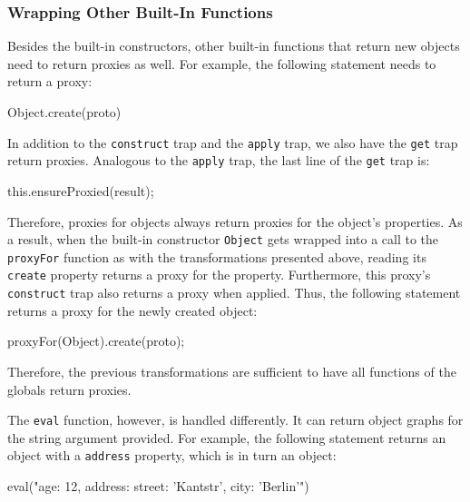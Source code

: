 \subsubsection{Wrapping Other Built-In Functions}

Besides the built-in constructors, other built-in functions that return new objects need to return proxies as well.
For example, the following statement needs to return a proxy:

\begin{code}{}{}
Object.create(proto)
\end{code}
\iffalse
\end{verbatim}\fi

In addition to the \lstinline{construct} trap and the \lstinline{apply} trap, we also have the \lstinline{get} trap return proxies.
Analogous to the \lstinline{apply} trap, the last line of the \lstinline{get} trap is:

\begin{code}{}{}
this.ensureProxied(result);
\end{code}
\iffalse
\end{verbatim}\fi


Therefore, proxies for objects always return proxies for the object's properties.
As a result, when the built-in constructor \lstinline{Object} gets wrapped into a call to the \lstinline{proxyFor} function as with the transformations presented above, reading its \lstinline{create} property returns a proxy for the property.
Furthermore, this proxy's \lstinline{construct} trap also returns a proxy when applied.
Thus, the following statement returns a proxy for the newly created object:

\begin{code}{}{}
proxyFor(Object).create(proto);
\end{code}
\iffalse
\end{verbatim}\fi

Therefore, the previous transformations are sufficient to have all functions of the globals return proxies.

The \lstinline{eval} function, however, is handled differently.
It can return object graphs for the string argument provided.
For example, the following statement returns an object with a \lstinline{address} property, which is in turn an object:

\begin{code}{}{}
eval("{age: 12, address: {street: 'Kantstr', city: 'Berlin'}}")
\end{code}
\iffalse
\end{verbatim}\fi

